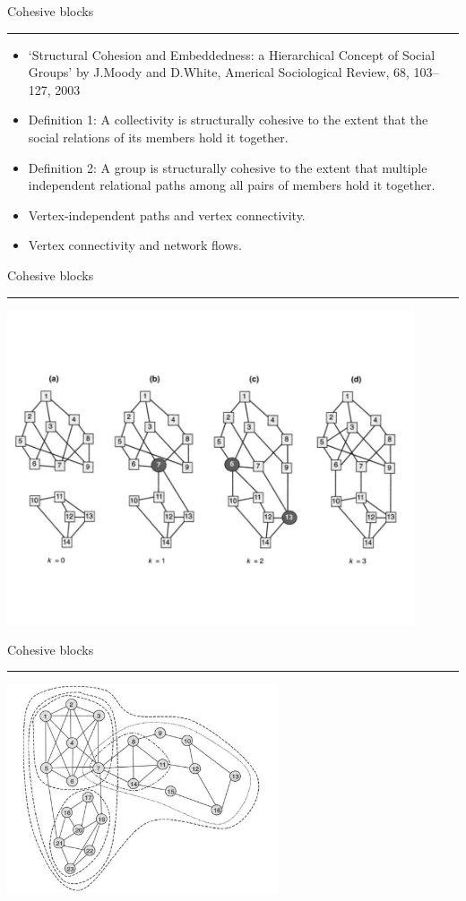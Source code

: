 \documentclass[landscape,fleqno]{foils}
\newcommand{\stitle}[1]{{\color{blue}\Large #1\par\vspace*{10pt}\hrule}}
\begin{document}
\newpage
\stitle{Cohesive blocks}

\begin{itemize}
\item `Structural Cohesion and Embeddedness: a Hierarchical
Concept of Social Groups' by J.Moody and D.White, Americal
Sociological Review, 68, 103--127, 2003 \pause
\item Definition 1: A collectivity is structurally cohesive to the extent
  that the social relations of its members hold it together.  \pause
\item Definition 2: A group is structurally cohesive to the extent that
  multiple independent relational paths among all pairs of members hold
  it together. \pause
\item Vertex-independent paths and vertex connectivity. \pause
\item Vertex connectivity and network flows.
\end{itemize}

\newpage
\stitle{Cohesive blocks}
\vspace*{-3cm}
{\centering
\includegraphics[width=0.9\textwidth]{../images/groups}\\
}

\newpage
\stitle{Cohesive blocks}
\includegraphics[width=0.6\textwidth]{../images/cblocks}\\
\end{document}
